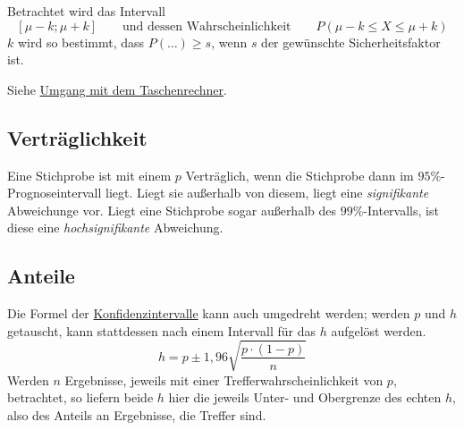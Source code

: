 \documentclass{article}
\begin{document}
Betrachtet wird das Intervall
\[
 [\mu-k;\mu+k]
 \qquad \text{und dessen Wahrscheinlichkeit} \qquad
 P(\mu- k \le X \le \mu+ k)
\]
$k$ wird so bestimmt, dass $P(\ldots) \ge s$, wenn $s$ der gewünschte Sicherheitsfaktor ist.
 
Siehe \hyperref[Umgang mit dem Taschenrechner]{Umgang mit dem Taschenrechner}. 
 
\subsection{Verträglichkeit} 
Eine Stichprobe ist mit einem $p$ Verträglich, wenn die Stichprobe dann im $95\%$-Prognoseintervall liegt. Liegt sie außerhalb von diesem, liegt eine \emph{signifikante} Abweichunge vor. Liegt eine Stichprobe sogar außerhalb des $99\%$-Intervalls, ist diese eine \emph{hochsignifikante} Abweichung.
 
\subsection{Anteile}
Die Formel der \hyperref[Konfidenzintervalle]{Konfidenzintervalle} kann auch umgedreht werden; werden $p$ und $h$ getauscht, kann stattdessen nach einem Intervall für das $h$ aufgelöst werden.
\[
 h = p \pm 1,96 \sqrt{\frac{p \cdot (1-p)}{n}}
\]
Werden $n$ Ergebnisse, jeweils mit einer Trefferwahrscheinlichkeit von $p$, betrachtet, so liefern beide $h$ hier die jeweils Unter- und Obergrenze des echten $h$, also des Anteils an Ergebnisse, die Treffer sind. 
\end{document}
